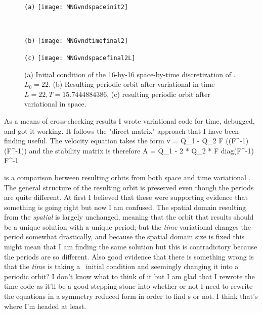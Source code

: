 \begin{figure}
\begin{minipage}[height=.32\textheight]{.45\textwidth}
\centering \small{\texttt{(a)}}
\texttt{[image: MNGvndspaceinit2]}
\end{minipage}
\\
\begin{minipage}[height=.32\textheight]{.45\textwidth}
\centering \small{\texttt{(b)}}
\texttt{[image: MNGvndtimefinal2]}
\end{minipage}
\begin{minipage}[height=.32\textheight]{.45\textwidth}
\centering \small{\texttt{(c)}}
\texttt{[image: MNGvndspacefinal2L]}
\end{minipage}
\caption{ \label{fig:MNGspaceandtime1}
(a) Initial condition of the 16-by-16 space-by-time discretization of
. $L_0 = 22$.
(b) Resulting periodic orbit after variational {\descent} in time $L =
22, T = 15.7444884386$,
(c) resulting periodic orbit after variational {\descent} in space.
}
\end{figure}

As a means of cross-checking results I wrote variational {\descent} code for time, debugged, and got it working. It follows the "direct-matrix" approach
that I have been finding useful.
The velocity equation takes the form
\beq \label{e-MNGkstimeDM}
v = Q_1 \cdot \Fu - Q_2 \cdot F \cdot ((F^{-1}\Fu) \star (F^{-1}\Fu))
\eeq
and the stability matrix is therefore
\beq
A = Q_1 - 2 * Q_2 * \cdot F \cdot diag(F^{-1}\Fu) \cdot F^{-1}
\eeq

 is a comparison between resulting orbits from both space and time variational {\descent}.
The general structure of the resulting orbit is preserved even though the periods are quite different. At first I believed that
these were supporting evidence that something is going right but now I am confused. The spatial domain resulting from the \emph{spatial}
{\descent} is largely unchanged, meaning that the orbit that results should be a unique solution with a unique period; but the \emph{time}
variational {\descent} changes the period somewhat drastically, and because the spatial domain size is fixed this might mean that I am
finding the same solution but this is contradictory because the periods are so different. Also good evidence that there is something wrong is that
the \emph{time} {\descent} is taking a \rpo\ initial condition and seemingly changing it into a periodic orbit? I don't know what
to think of it but I am glad that I rewrote the time {\descent} code as it'll be a good stepping stone into whether or not I need to rewrite the equations
in a symmetry reduced form in order to find {\rpo}s or not. I think that's where I'm headed at least.

